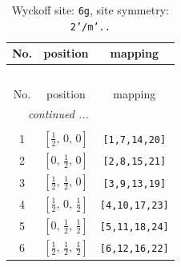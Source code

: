 \documentclass[fleqn,8pt]{jsarticle}
\begin{document}
\renewcommand{\arraystretch}{1.2}
\begin{longtable}{ccc}
\caption{Wyckoff site: {\tt 6g}, site symmetry: {\tt 2'/m'..}}
 \\
 \hline \hline
No. & position & mapping \\ \hline \endfirsthead

\multicolumn{2}{l}{\tablename\ \thetable{}} \\
 \hline \hline
No. & position & mapping \\ \hline \endhead

 \hline \hline
\multicolumn{2}{r}{\footnotesize\it continued ...} \\ \endfoot

 \hline \hline
\multicolumn{2}{r}{} \\ \endlastfoot

1 & $\left[ \frac{1}{2},\, 0,\, 0 \right]$ & {\tt [1,7,14,20]} \\ \hline
2 & $\left[ 0,\, \frac{1}{2},\, 0 \right]$ & {\tt [2,8,15,21]} \\ \hline
3 & $\left[ \frac{1}{2},\, \frac{1}{2},\, 0 \right]$ & {\tt [3,9,13,19]} \\ \hline
4 & $\left[ \frac{1}{2},\, 0,\, \frac{1}{2} \right]$ & {\tt [4,10,17,23]} \\ \hline
5 & $\left[ 0,\, \frac{1}{2},\, \frac{1}{2} \right]$ & {\tt [5,11,18,24]} \\ \hline
6 & $\left[ \frac{1}{2},\, \frac{1}{2},\, \frac{1}{2} \right]$ & {\tt [6,12,16,22]} \\
\end{longtable}
\renewcommand{\arraystretch}{1.2}
\end{document}
